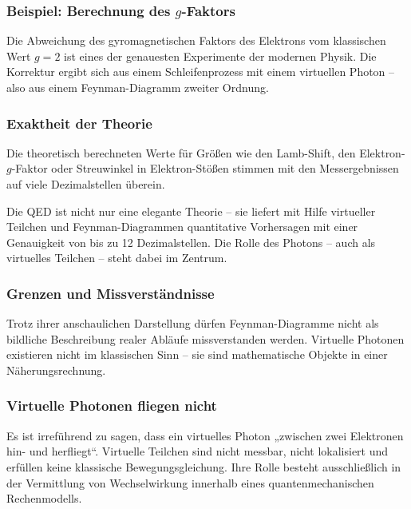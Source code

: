 \subsubsection*{Beispiel: Berechnung des $g$-Faktors}
Die Abweichung des gyromagnetischen Faktors des Elektrons vom klassischen Wert $g = 2$ ist eines der genauesten Experimente der modernen Physik. Die Korrektur ergibt sich aus einem Schleifenprozess mit einem virtuellen Photon – also aus einem Feynman-Diagramm zweiter Ordnung.

\subsubsection*{Exaktheit der Theorie}
Die theoretisch berechneten Werte für Größen wie den Lamb-Shift, den Elektron-$g$-Faktor oder Streuwinkel in Elektron-Stößen stimmen mit den Messergebnissen auf viele Dezimalstellen überein.
\medskip
\begin{tcolorbox}[didaktikbox, title=Die Quantenelektrodynamik als Erfolgsmodell]
	\label{box:Die Quantenelekrodynamik}
	Die QED ist nicht nur eine elegante Theorie – sie liefert mit Hilfe virtueller Teilchen und Feynman-Diagrammen quantitative Vorhersagen mit einer Genauigkeit von bis zu 12 Dezimalstellen. Die Rolle des Photons – auch als virtuelles Teilchen – steht dabei im Zentrum.
\end{tcolorbox}

\subsubsection{Grenzen und Missverständnisse}

Trotz ihrer anschaulichen Darstellung dürfen Feynman-Diagramme nicht als bildliche Beschreibung realer Abläufe missverstanden werden. Virtuelle Photonen existieren nicht im klassischen Sinn – sie sind mathematische Objekte in einer Näherungsrechnung.

\subsubsection*{Virtuelle Photonen fliegen nicht}
Es ist irreführend zu sagen, dass ein virtuelles Photon „zwischen zwei Elektronen hin- und herfliegt“. Virtuelle Teilchen sind nicht messbar, nicht lokalisiert und erfüllen keine klassische Bewegungsgleichung. Ihre Rolle besteht ausschließlich in der Vermittlung von Wechselwirkung innerhalb eines quantenmechanischen Rechenmodells.

